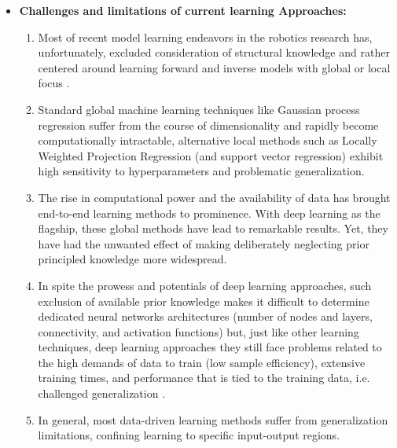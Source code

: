 \documentclass[12pt, a4paper]{article}
\begin{document}
\begin{itemize}
	\item \textbf{Challenges and limitations of current learning Approaches:}
	\begin{enumerate}
		\item Most of recent model learning endeavors in the robotics research has, unfortunately, excluded consideration of structural knowledge and rather centered around learning forward and inverse models with global or local focus \cite{NguyenTuong2011Modellearningrobot}.
		\item Standard global machine learning techniques like Gaussian process regression suffer from the course of dimensionality and rapidly become computationally intractable, alternative local methods such as Locally Weighted Projection Regression (and support vector regression) exhibit high sensitivity to hyperparameters and problematic generalization.
		\item The rise in computational power and the availability of data has brought end-to-end learning methods to prominence. With deep learning as the flagship, these global methods have lead to remarkable results. Yet, they have had the unwanted effect of making deliberately neglecting prior principled knowledge more widespread.
		\item In spite the prowess and potentials of deep learning approaches, such exclusion of available prior knowledge makes it difficult to determine dedicated neural networks architectures (number of nodes and layers, connectivity, and activation functions) \cite{Baker2017Designingneuralnetwork,Elsken2019Neuralarchitecturesearch} but, just like other learning techniques, deep learning approaches they still face problems related to the high demands of data to train (low sample efficiency), extensive training times, and performance that is tied to the training data, i.e. challenged generalization \cite{Pierson2017Deeplearningrobotics,Suenderhauf2018limitspotentialsdeep}.
		\item In general, most data-driven learning methods suffer from generalization limitations, confining learning to specific input-output regions.
	\end{enumerate}	
	

\end{itemize}
\end{document}
